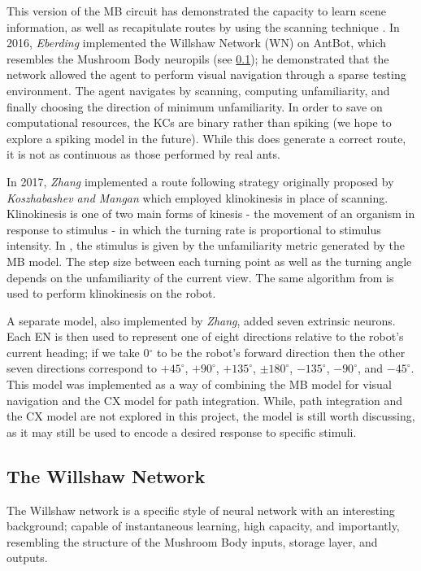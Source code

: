 \documentclass[a4paper,12pt]{article}
\begin{document}
This version of the MB circuit has demonstrated the capacity to learn scene information, as well
as recapitulate routes by using the scanning technique \cite{Ardin2016}. In 2016, \textit{Eberding}
implemented the Willshaw Network (WN) on AntBot, which resembles the Mushroom Body neuropils (see \ref{sec:wn}); he
demonstrated that the network allowed the agent to perform visual navigation through a sparse testing
environment\cite{Eberding2016}. The agent navigates by scanning, computing unfamiliarity, and finally
choosing the direction of minimum unfamiliarity. In order to save on computational resources, the
KCs are binary rather than spiking (we hope to explore a spiking model in the future). While this does
generate a correct route, it is not as continuous as those performed by real ants.
\newline

In 2017, \textit{Zhang} implemented a route following strategy originally proposed by
\textit{Koszhabashev and Mangan} which employed klinokinesis in place of scanning. Klinokinesis
is one of two main forms of kinesis - the movement of an organism in response to stimulus - in which
the turning rate is proportional to stimulus intensity. In \cite{Zhang2017}, the
stimulus is given by the unfamiliarity metric generated by the MB model. The step size between each
turning point as well as the turning angle depends on the unfamiliarity of the current view. The same
algorithm from \cite{Kodzhabashev2015} is used to perform klinokinesis on the robot.
\newline

A separate model, also implemented by \textit{Zhang}, added seven extrinsic neurons. Each EN is then
used to represent one of eight directions relative to the robot's current heading; if we take 0$^\circ$
to be the robot's forward direction then the other seven directions correspond to $+45^\circ$,
$+90^\circ$, $+135^\circ$, $\pm180^\circ$, $-135^\circ$, $-90^\circ$, and $-45^\circ$. This model was implemented as a way of
combining the MB model for visual navigation and the CX model for path integration. While, path
integration and the CX model are not explored in this project, the model is still worth discussing,
as it may still be used to encode a desired response to specific stimuli.


\subsection{The Willshaw Network} \label{sec:wn}
The Willshaw network is a specific style of neural network with an interesting background; capable of
instantaneous learning, high capacity, and importantly, resembling the structure of the Mushroom Body
inputs, storage layer, and outputs.
\newline
\end{document}

